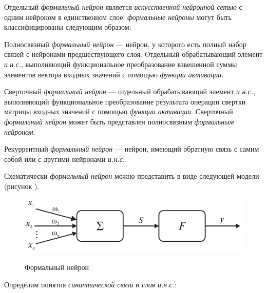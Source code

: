 Отдельный \textit{формальный нейрон} является \textit{искусственной нейронной сетью} с одним нейроном в единственном слое.
\textit{формальные нейроны} могут быть классифицированы следующим образом:
\begin{textitemize}
	\item Полносвязный \textit{формальный нейрон} --- нейрон, у которого есть полный набор связей с нейронами предшествующего слоя. Oтдельный обрабатывающий элемент \textit{и.н.с.}, выполняющий функциональное преобразование взвешенной суммы элементов вектора входных значений с помощью \textit{функции активации}.
	\item Сверточный \textit{формальный нейрон} --- отдельный обрабатывающий элемент \textit{и.н.с.}, выполняющий функциональное преобразование результата операции свертки матрицы входных значений с помощью \textit{функции активации}. Сверточный \textit{формальный нейрон} может быть представлен полносвязным \textit{формальным нейроном}.
	\item Рекуррентный \textit{формальный нейрон} --- нейрон, имеющий обратную связь с самим собой или с другими нейронами \textit{и.н.с.}.
\end{textitemize}

Схематически \textit{формальный нейрон} можно представить в виде следующей модели (рисунок \textit{}).

\begin{figure}[H]
	\centering
	\caption{Формальный нейрон}
	\includegraphics[scale=0.4]{author/part3/figures/formal_neuron.png}
	\label{fig:formal_neuron}
\end{figure}

Определим понятия \textit{синаптической связи} и \textit{слоя и.н.с.}:

\begin{SCn}

\end{SCn}

